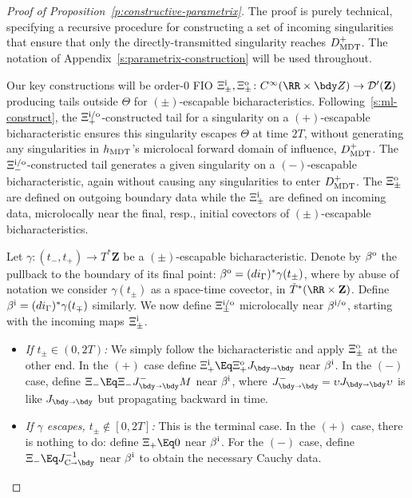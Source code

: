 \documentclass[10pt]{article}
\theoremstyle{plain}
\theoremstyle{definition}
\theoremstyle{remark}
\numberwithin{theorem}{section}
\numberwithin{example}{section}
\numberwithin{equation}{section}
\numberwithin{figure}{section}
\newcommand\sref[1]{\textsection\ref{#1}}					%
\newcommand\To{\smash{\mathring T}\vphantom{T}}			%
\newcommand\MDT{\ensuremath{_{\text{\normalfont MDT}}}}	%
\newcommand\JCB{J_{\text C\shortrightarrow \bdy}}		%
\newcommand\JBB{J_{\bdy\shortrightarrow \bdy}}			%
\newcommand\supi{^{\text i}}						%
\newcommand\supo{^{\text o}}						%
\newcommand\supio{^{\smash{\text i/\text o}}}			%
\newcommand\eqml{\Eq}					%
\begin{document}
\begin{proof}[Proof of Proposition~\ref{p:constructive-parametrix}]
	The proof is purely technical, specifying a recursive procedure for constructing a set of incoming singularities that ensure that only the directly-transmitted singularity reaches $D^+\MDT$. The notation of Appendix~\ref{s:parametrix-construction} will be used throughout.
	
	Our key constructions will be order-0 FIO $\Xi\supi_\pm,\Xi\supo_\pm\colon C^\infty(\RR\times\bdy Z)\to \mathcal D'(\mathbf Z)$ producing tails outside $\Theta$ for $(\pm)$-escapable bicharacteristics. Following~\sref{s:ml-construct}, the $\Xi_+\supio$-constructed tail for a singularity on a $(+)$-escapable bicharacteristic ensures this singularity escapes $\Theta$ at time $2T$, without generating any singularities in $h\MDT$'s microlocal forward domain of influence, $D^+\MDT$. The $\Xi\supio_-$-constructed tail generates a given singularity on a $(-)$-escapable bicharacteristic, again without causing any singularities to enter $D^+\MDT$. The $\Xi_\pm\supo$ are defined on outgoing boundary data while the $\Xi_\pm\supi$ are defined on incoming data, microlocally near the final, resp., initial covectors of $(\pm)$-escapable bicharacteristics.
	
	Let $\gamma\colon(t_-,t_+)\to T^*\mathbf Z$ be a $(\pm)$-escapable bicharacteristic. Denote by $\beta\supo$ the pullback to the boundary of its final point: $\beta\supo=(di_\Gamma)^*\gamma(t_\pm)$, where by abuse of notation we consider $\gamma(t_\pm)$ as a space-time covector, in $\To^*(\RR\times\mathbf Z)$. Define $\beta\supi=(di_\Gamma)^*\gamma(t_\mp)$ similarly. We now define $\Xi\supio_\pm$ microlocally near $\beta\supio$, starting with the incoming maps $\Xi\supi_\pm$.
\begin{itemize}
	\item
	\emph{If $t_\pm\in(0,2T)$:} We simply follow the bicharacteristic and apply $\Xi\supo_\pm$ at the other end. In the $(+)$ case define $\Xi\supi_+\eqml \Xi\supo_+\JBB$ near $\beta\supi$. In the $(-)$ case, define $\Xi_-\eqml \Xi_-  \JBB^- M$ near $\beta\supi$, where $\JBB^-=\upsilon\JBB\upsilon$ is like $\JBB$ but propagating backward in time. 
	
	\item
	\emph{If $\gamma$ escapes, $t_\pm\notin[0,2T]$:} This is the terminal case. In the $(+)$ case, there is nothing to do: define $\Xi_+\eqml 0$ near $\beta\supi$. For the $(-)$ case, define $\Xi_-\eqml \JCB^{-1}$ near $\beta\supi$ to obtain the necessary Cauchy data.
\end{itemize}
	

\end{proof}
\end{document}

